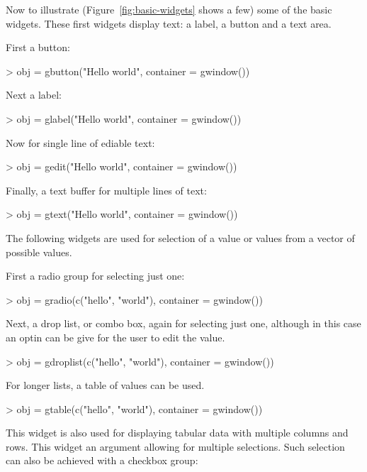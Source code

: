 \documentclass[12pt]{article}
\begin{document}
Now to illustrate (Figure~\ref{fig:basic-widgets} shows a few) some of
the basic widgets.
These first widgets display text: a label, a button and a text area.


First a button:
\begin{Schunk}
\begin{Sinput}
> obj = gbutton("Hello world", container = gwindow())
\end{Sinput}
\end{Schunk}

Next a label:
\begin{Schunk}
\begin{Sinput}
> obj = glabel("Hello world", container = gwindow())
\end{Sinput}
\end{Schunk}

Now for single line of ediable text:
\begin{Schunk}
\begin{Sinput}
> obj = gedit("Hello world", container = gwindow())
\end{Sinput}
\end{Schunk}

Finally, a text buffer for multiple lines of text:
\begin{Schunk}
\begin{Sinput}
> obj = gtext("Hello world", container = gwindow())
\end{Sinput}
\end{Schunk}


The following widgets are used for selection of a value or values from
a vector of possible values.

First a radio group for selecting just one:
\begin{Schunk}
\begin{Sinput}
> obj = gradio(c("hello", "world"), container = gwindow())
\end{Sinput}
\end{Schunk}

Next, a drop list, or combo box, again for selecting just one,
although in this case an optin can be give for the user to edit the value.
\begin{Schunk}
\begin{Sinput}
> obj = gdroplist(c("hello", "world"), container = gwindow())
\end{Sinput}
\end{Schunk}

For longer lists, a table of values can be used.
\begin{Schunk}
\begin{Sinput}
> obj = gtable(c("hello", "world"), container = gwindow())
\end{Sinput}
\end{Schunk}
This widget is also used for displaying tabular data with multiple
columns and rows.  This widget an argument allowing for multiple
selections. Such selection can also be achieved with a checkbox group:
\end{document}
